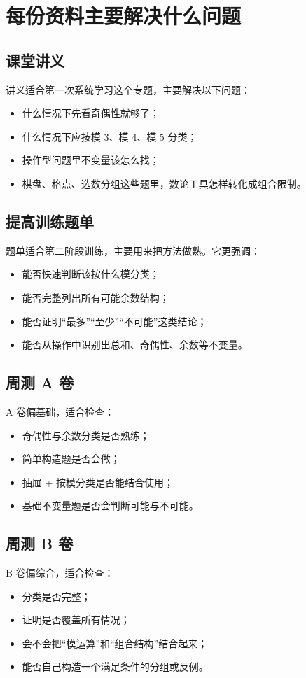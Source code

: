 \documentclass[11pt,a4paper,fontset=fandol]{ctexart}
\begin{document}
\section{每份资料主要解决什么问题}

\subsection{课堂讲义}
讲义适合第一次系统学习这个专题，主要解决以下问题：
\begin{itemize}
  \item 什么情况下先看奇偶性就够了；
  \item 什么情况下应按模 $3$、模 $4$、模 $5$ 分类；
  \item 操作型问题里不变量该怎么找；
  \item 棋盘、格点、选数分组这些题里，数论工具怎样转化成组合限制。
\end{itemize}

\subsection{提高训练题单}
题单适合第二阶段训练，主要用来把方法做熟。它更强调：
\begin{itemize}
  \item 能否快速判断该按什么模分类；
  \item 能否完整列出所有可能余数结构；
  \item 能否证明“最多”“至少”“不可能”这类结论；
  \item 能否从操作中识别出总和、奇偶性、余数等不变量。
\end{itemize}

\subsection{周测 A 卷}
A 卷偏基础，适合检查：
\begin{itemize}
  \item 奇偶性与余数分类是否熟练；
  \item 简单构造题是否会做；
  \item 抽屉 + 按模分类是否能结合使用；
  \item 基础不变量题是否会判断可能与不可能。
\end{itemize}

\subsection{周测 B 卷}
B 卷偏综合，适合检查：
\begin{itemize}
  \item 分类是否完整；
  \item 证明是否覆盖所有情况；
  \item 会不会把“模运算”和“组合结构”结合起来；
  \item 能否自己构造一个满足条件的分组或反例。
\end{itemize}
\end{document}
